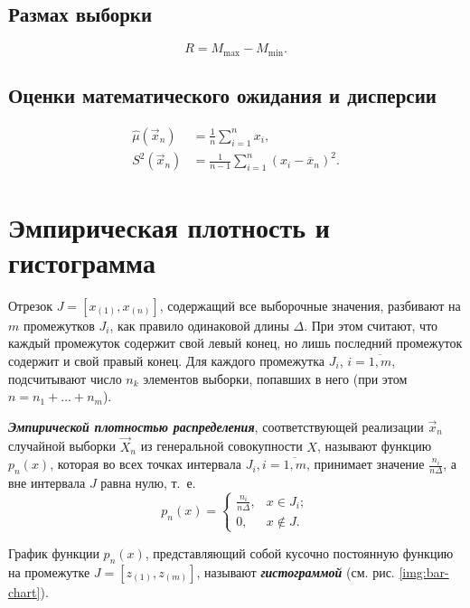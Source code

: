 \documentclass[a4paper,oneside,12pt]{extreport}
\begin{document}
\subsection{Размах выборки}
\begin{equation}
	R = M_{\max} - M_{\min}.
\end{equation}

\subsection{Оценки математического ожидания и дисперсии}
\begin{align}
	\hat\mu(\vec x_n) &= \frac 1n \sum_{i=1}^n x_i,\\
	S^2(\vec x_n) &= \frac 1{n-1} \sum_{i=1}^n (x_i-\overline x_n)^2.
\end{align}

\pagebreak
\section{Эмпирическая плотность и гистограмма}

Отрезок $J = [x_{(1)}, x_{(n)}]$, содержащий все выборочные значения, разбивают на $m$ промежутков $J_i$, как правило одинаковой длины $\Delta$.
При этом считают, что каждый промежуток содержит свой левый конец, но лишь последний промежуток содержит и свой правый конец.
Для каждого промежутка $J_i$, $i = \overline{1,m}$, подсчитывают число $n_k$ элементов выборки, попавших в него (при этом $n = n_1 + \ldots + n_m$).

\begin{definition}
	{\itshape\bfseries Эмпирической плотностью распределения}, соответствующей реализации $\vec x_n$ случайной выборки $\vec X_n$ из генеральной совокупности $X$, называют функцию $p_n(x)$, которая во всех точках интервала $J_i, i=\overline{1,m}$, принимает значение $\frac{n_i}{n\Delta}$, а вне интервала $J$ равна нулю, т.~е.
	\begin{equation}
		p_n(x) = \begin{cases}
			\frac{n_{i}}{n\Delta}, & x\in J_{i};\\
			0,                     & x\notin J.
		\end{cases}
	\end{equation}
\end{definition}

График функции $p_n(x)$, представляющий собой кусочно постоянную функцию на промежутке $J = [z_{(1)}, z_{(m)}]$, называют {\itshape\bfseries гистограммой} (см. рис. \ref{img:bar-chart}).
\end{document}
